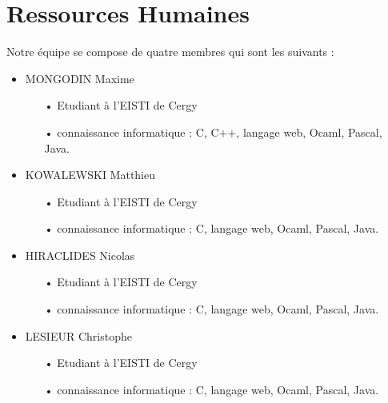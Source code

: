 \documentclass[10pt,a4paper,titlepage]{report}
\begin{document}
	\section{Ressources Humaines}
	Notre équipe se compose de quatre membres qui sont les suivants :
	\begin{itemize}
		\item	MONGODIN Maxime
			\begin{itemize}
			 \item[•] Etudiant à l’EISTI de Cergy
			 \item[•] connaissance informatique : C, C++, langage web, Ocaml, Pascal, Java. 

			\end{itemize}
		

		\item	KOWALEWSKI Matthieu
			\begin{itemize}
			 \item[•] Etudiant à l’EISTI de Cergy
			 \item[•] connaissance informatique : C, langage web, Ocaml, Pascal, Java. 

			\end{itemize}
	\item	HIRACLIDES Nicolas
			\begin{itemize}
			 \item[•] Etudiant à l’EISTI de Cergy
			 \item[•] connaissance informatique : C, langage web, Ocaml, Pascal, Java. 

			\end{itemize}
		\item	LESIEUR Christophe
			\begin{itemize}
			 \item[•] Etudiant à l’EISTI de Cergy
			 \item[•] connaissance informatique : C, langage web, Ocaml, Pascal, Java. 

			\end{itemize}
	\end{itemize}
\end{document}
